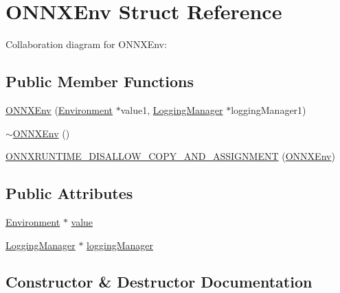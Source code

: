 \hypertarget{structONNXEnv}{}\section{O\+N\+N\+X\+Env Struct Reference}
\label{structONNXEnv}


Collaboration diagram for O\+N\+N\+X\+Env\+:
\subsection*{Public Member Functions}
\begin{DoxyCompactItemize}
\item 
\mbox{\hyperlink{structONNXEnv_abf4a6571f5fff6a010eb9fcd2a944662}{O\+N\+N\+X\+Env}} (\mbox{\hyperlink{classonnxruntime_1_1Environment}{Environment}} $\ast$value1, \mbox{\hyperlink{classonnxruntime_1_1logging_1_1LoggingManager}{Logging\+Manager}} $\ast$logging\+Manager1)
\item 
\mbox{\hyperlink{structONNXEnv_a84af77684eef3cdd146bc9669e95c939}{$\sim$\+O\+N\+N\+X\+Env}} ()
\item 
\mbox{\hyperlink{structONNXEnv_a9c40fefb478d618e1ef2917df2ff916e}{O\+N\+N\+X\+R\+U\+N\+T\+I\+M\+E\+\_\+\+D\+I\+S\+A\+L\+L\+O\+W\+\_\+\+C\+O\+P\+Y\+\_\+\+A\+N\+D\+\_\+\+A\+S\+S\+I\+G\+N\+M\+E\+NT}} (\mbox{\hyperlink{structONNXEnv}{O\+N\+N\+X\+Env}})
\end{DoxyCompactItemize}
\subsection*{Public Attributes}
\begin{DoxyCompactItemize}
\item 
\mbox{\hyperlink{classonnxruntime_1_1Environment}{Environment}} $\ast$ \mbox{\hyperlink{structONNXEnv_a5189cb87f1e0eb6faa792361fc4ecb78}{value}}
\item 
\mbox{\hyperlink{classonnxruntime_1_1logging_1_1LoggingManager}{Logging\+Manager}} $\ast$ \mbox{\hyperlink{structONNXEnv_acb6d205bd576c2702b73187839b9117c}{logging\+Manager}}
\end{DoxyCompactItemize}


\subsection{Constructor \& Destructor Documentation}
\mbox{\label{structONNXEnv_abf4a6571f5fff6a010eb9fcd2a944662}} 
